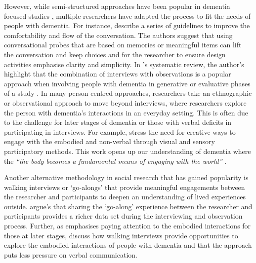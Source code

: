 However, while semi-structured approaches have been popular in dementia focused studies \citep{samsi_everyday_2013,mazaheri2013experiences,cheston2000involving,lejman2013ethics}, multiple researchers have adapted the process to fit the needs of people with dementia. For instance, \cite{mayer2013lessons} describe a series of guidelines to improve the comfortability and flow of the conversation. The authors suggest that using conversational probes that are based on memories or meaningful items can lift the conversation and keep choices and for the researcher to ensure design activities emphasise clarity and simplicity. In \citeauthor{suijkerbuijk_active_2019}'s systematic review, the author's highlight that the combination of interviews with observations is a popular approach when involving people with dementia in generative or evaluative phases of a study \citep{suijkerbuijk_active_2019}. In many person-centred approaches, researchers take an ethnographic or observational approach to move beyond interviews, where researchers explore the person with dementia's interactions in an everyday setting. This is often due to the challenge for later stages of dementia or those with verbal deficits in participating in interviews. For example, \cite{kontos_embodiment_2013} stress the need for creative ways to engage with the embodied and non-verbal through visual and sensory participatory methods. This work opens up our understanding of dementia where the \textit{``the body becomes a fundamental means of engaging with the world''} \citep[pg.296]{kontos_embodiment_2013}.

Another alternative methodology in social research that has gained popularity is walking interviews or `go-alongs' that provide meaningful engagements between the researcher and participants to deepen an understanding of lived experiences outside. \cite{hein2008mobile} argue's that sharing the `go-along' experience between the researcher and participants provides a richer data set during the interviewing and observation process. Further, as \cite{foley_struggle_2019} emphasises paying attention to the embodied interactions for those at later stages, \cite{kullberg2017walking}  discuss how walking interviews provide opportunities to explore the embodied interactions of people with dementia and that the approach puts less pressure on verbal communication. 

